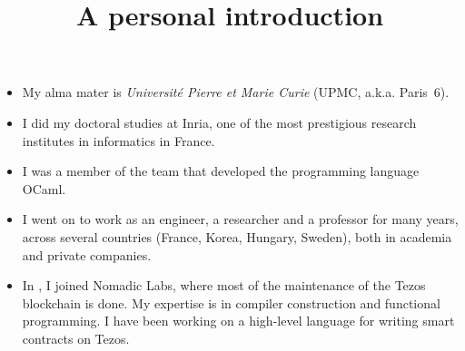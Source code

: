 \documentclass[wide]{slides}
\begin{document}
\maketitle

\begin{slide}
  \title{A personal introduction}

  \begin{itemize}

    \item My alma mater is \emph{Universit\'e Pierre et Marie Curie}
      (UPMC, a.k.a. Paris~6).

    \item I did my doctoral studies at Inria, one of the most
      prestigious research institutes in informatics in France.

    \item I was a member of the team that developed the programming
      language OCaml.

    \item I went on to work as an engineer, a researcher and a
      professor for many years, across several countries (France,
      Korea, Hungary, Sweden), both in academia and private
      companies.

    \item In , I joined Nomadic Labs, where most of
      the maintenance of the Tezos blockchain is done. My expertise is
      in compiler construction and functional programming. I have been
      working on a high-level language for writing smart contracts on
      Tezos.

  \end{itemize}

\end{slide}
\end{document}
